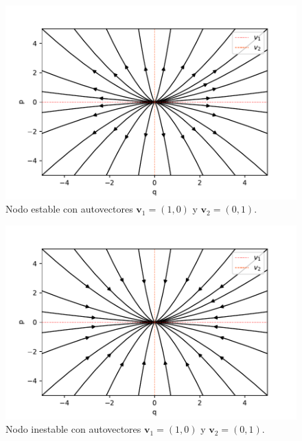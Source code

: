 \documentclass[12pt,a4paper]{article}
\numberwithin{equation}{section}
\numberwithin{figure}{section}
\newcommand{\vn}{\mathbf{v}}
\begin{document}
\begin{figure}[h!] \centering
\includegraphics[scale=0.9]{punto-estable.pdf}
\caption{Nodo estable con autovectores $\vn_1=(1,0)$ y $\vn_2 = (0,1)$.}
\label{Fig:01-nodoestable}
\end{figure}

\newpage

\begin{figure}[h!] \centering
\includegraphics[scale=0.9]{punto-inestable.pdf}
\caption{Nodo inestable con autovectores $\vn_1=(1,0)$ y $\vn_2 = (0,1)$.}
\label{Fig:02-nodoinestable}
\end{figure}
\end{document}
